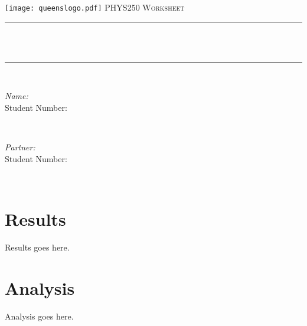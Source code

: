 \documentclass[12pt,oneside,oldfontcommands]{memoir}
\makeatletter
\def\maketitle{%
  \null
  \thispagestyle{empty}
  \begin{center}\leavevmode
       \normalfont
       \texttt{[image: queenslogo.pdf]}
       \vskip 0.5cm   
       \textsc{\Large PHYS250 Worksheet}\\[0.5 cm]
	     {\large \@date\par}
       \vskip 1.0cm
	\rule{\linewidth}{0.2 mm} \\[0.4 cm]
	{ \huge \bfseries \@title}\\
	\rule{\linewidth}{0.2 mm} \\[1.5 cm]
	
	\begin{minipage}{0.5\textwidth}
		\begin{flushleft} \large
			\emph{Name:} \studentone\\
			Student Number: \studentonenumber
			\end{flushleft}
			\end{minipage}~
			\begin{minipage}{0.4\textwidth}
			\begin{flushleft} \large
			\emph{Partner:} \studenttwo\\
			Student Number: \studenttwonumber
		\end{flushleft}
	\end{minipage}\\[2 cm]
   \end{center}
   \vfill
   \null
   \cleardoublepage
  }
\makeatother
\begin{document}
\maketitle
\frontmatter
\let\cleardoublepage\clearpage
\mainmatter
\sloppy







\section*{Results}
Results goes here. 


\section*{Analysis}
Analysis goes here. 
\end{document}
